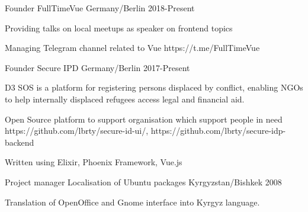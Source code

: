 \begin{cventries}
  \cventry
    {Founder}
    {FullTimeVue}
    {Germany/Berlin}
    {2018-Present}
    {
      \begin{cvitems}
        \item {Providing talks on local meetups as speaker on frontend topics}
        \item {Managing Telegram channel related to Vue https://t.me/FullTimeVue}
      \end{cvitems}
    }
  \cventry
    {Founder}
    {Secure IPD}
    {Germany/Berlin}
    {2017-Present}
    {
      \begin{cvitems}
        \item {D3 SOS is a platform for registering persons displaced by conflict, enabling NGOs to help internally displaced refugees access legal and financial aid.}
        \item {Open Source platform to support organisation which support people in need https://github.com/lbrty/secure-id-ui/, https://github.com/lbrty/secure-idp-backend}
        \item {Written using Elixir, Phoenix Framework, Vue.js}
      \end{cvitems}
    }
  \cventry
    {Project manager}
    {Localisation of Ubuntu packages}
    {Kyrgyzstan/Bishkek}
    {2008}
    {
      \begin{cvitems}
        \item {Translation of OpenOffice and Gnome interface into Kyrgyz language.}
      \end{cvitems}
    }
\end{cventries}
